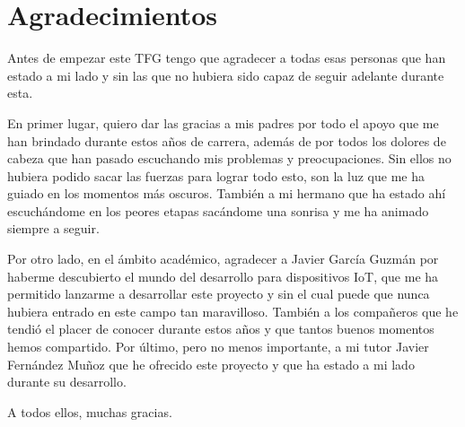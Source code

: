 \newpage %
\thispagestyle{empty}
\mbox{}

\chapter*{Agradecimientos}
\setcounter{page}{5}
Antes de empezar este TFG tengo que agradecer a todas esas personas que han estado a mi lado y sin las que no hubiera sido capaz de seguir adelante durante esta.

En primer lugar, quiero dar las gracias a mis padres por todo el apoyo que me han brindado durante estos años de carrera, además de por todos los dolores de cabeza que han pasado escuchando mis problemas y preocupaciones. Sin ellos no hubiera podido sacar las fuerzas para lograr todo esto, son la luz que me ha guiado en los momentos más oscuros. También a mi hermano que ha estado ahí escuchándome en los peores etapas sacándome una sonrisa y me ha animado siempre a seguir.

Por otro lado, en el ámbito académico, agradecer a Javier García Guzmán por haberme descubierto el mundo del desarrollo para dispositivos IoT, que me ha permitido lanzarme a desarrollar este proyecto y sin el cual puede que nunca hubiera entrado en este campo tan maravilloso. También a los compañeros que he tendió el placer de conocer durante estos años y que tantos buenos momentos hemos compartido. Por último, pero no menos importante, a mi tutor Javier Fernández Muñoz que he ofrecido este proyecto y que ha estado a mi lado durante su desarrollo.

A todos ellos, muchas gracias.